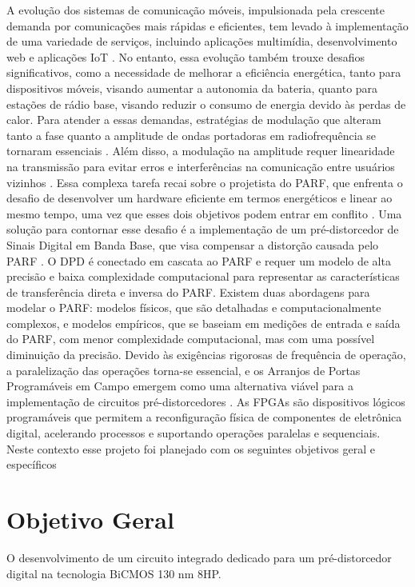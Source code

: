 A evolução dos sistemas de comunicação móveis, impulsionada pela crescente demanda por comunicações mais rápidas e eficientes, tem levado à implementação de uma variedade de serviços, incluindo aplicações multimídia, desenvolvimento web e aplicações IoT \cite{John2016}. No entanto, essa evolução também trouxe desafios significativos, como a necessidade de melhorar a eficiência energética, tanto para dispositivos móveis, visando aumentar a autonomia da bateria, quanto para estações de rádio base, visando reduzir o consumo de energia devido às perdas de calor. Para atender a essas demandas, estratégias de modulação que alteram tanto a fase quanto a amplitude de ondas portadoras em radiofrequência se tornaram essenciais \cite{Kenington2000}. Além disso, a modulação na amplitude requer linearidade na transmissão para evitar erros e interferências na comunicação entre usuários vizinhos \cite{Cripps2006}. Essa complexa tarefa recai sobre o projetista do PARF, que enfrenta o desafio de desenvolver um hardware eficiente em termos energéticos e linear ao mesmo tempo, uma vez que esses dois objetivos podem entrar em conflito \cite{Chavez2018}. Uma solução para contornar esse desafio é a implementação de um pré-distorcedor de Sinais Digital em Banda Base, que visa compensar a distorção causada pelo PARF \cite{Cripps2006}. O DPD é conectado em cascata ao PARF e requer um modelo de alta precisão e baixa complexidade computacional para representar as características de transferência direta e inversa do PARF. Existem duas abordagens para modelar o PARF: modelos físicos, que são detalhadas e computacionalmente complexos, e modelos empíricos, que se baseiam em medições de entrada e saída do PARF, com menor complexidade computacional, mas com uma possível diminuição da precisão. Devido às exigências rigorosas de frequência de operação, a paralelização das operações torna-se essencial, e os Arranjos de Portas Programáveis em Campo emergem como uma alternativa viável para a implementação de circuitos pré-distorcedores \cite{Pedroni2010}. As FPGAs são dispositivos lógicos programáveis que permitem a reconfiguração física de componentes de eletrônica digital, acelerando processos e suportando operações paralelas e sequenciais. Neste contexto esse projeto foi planejado com os seguintes objetivos geral e específicos

\section{Objetivo Geral}
O desenvolvimento de um circuito integrado dedicado para um pré-distorcedor digital na tecnologia BiCMOS 130 nm 8HP.
